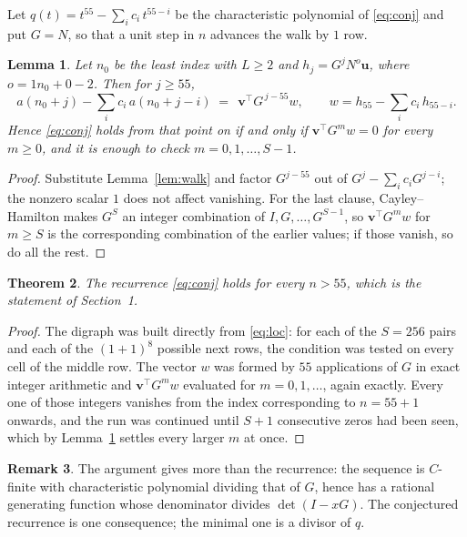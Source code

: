 \documentclass[11pt,a4paper]{article}
\theoremstyle{plain}
\newtheorem{theorem}{Theorem}
\newtheorem{lemma}[theorem]{Lemma}
\theoremstyle{definition}
\newtheorem{remark}[theorem]{Remark}
\begin{document}
Let $q(t)=t^{55}-\sum_i c_i\,t^{55-i}$ be the characteristic polynomial of
\eqref{eq:conj} and put $G=N$, so that a unit step in $n$ advances the walk by
$1$ row.

\begin{lemma}\label{lem:crit}
Let $n_0$ be the least index with $L\ge2$ and $h_j=G^{j}N^{o}\mathbf{u}$, where
$o=1n_0+0-2$. Then for $j\ge55$,
\[
a(n_0+j)-\sum_i c_i\,a(n_0+j-i)\;=\;\,\mathbf{v}^{\!\top}G^{\,j-55}w,
\qquad w=h_{55}-\sum_i c_i\,h_{55-i} .
\]
Hence \eqref{eq:conj} holds from that point on if and only if
$\mathbf{v}^{\!\top}G^{m}w=0$ for every $m\ge0$, and it is enough to check
$m=0,1,\dots,S-1$.
\end{lemma}

\begin{proof}
Substitute Lemma~\ref{lem:walk} and factor $G^{j-55}$ out of
$G^{j}-\sum_ic_iG^{j-i}$; the nonzero scalar $1$ does not affect
vanishing. For the last clause, Cayley--Hamilton makes $G^{S}$ an integer combination of
$I,G,\dots,G^{S-1}$, so $\mathbf{v}^{\!\top}G^{m}w$ for $m\ge S$ is the corresponding
combination of the earlier values; if those vanish, so do all the rest.
\end{proof}

\begin{theorem}
The recurrence \eqref{eq:conj} holds for every $n>55$, which is the statement of
Section~1.
\end{theorem}

\begin{proof}
The digraph was built directly from \eqref{eq:loc}: for each of the $S=256$ pairs and each
of the $(1+1)^{8}$ possible next rows, the condition was tested on every cell of
the middle row. The vector $w$ was formed by $55$ applications of $G$ in exact integer
arithmetic and $\mathbf{v}^{\!\top}G^{m}w$ evaluated for $m=0,1,\dots$, again exactly.
Every one of those integers vanishes from the index corresponding to $n=55+1$ onwards,
and the run was continued until $S+1$ consecutive zeros had been seen, which by
Lemma~\ref{lem:crit} settles every larger $m$ at once.
\end{proof}

\begin{remark}
The argument gives more than the recurrence: the sequence is $C$-finite with characteristic
polynomial dividing that of $G$, hence has a rational generating function whose denominator
divides $\det(I-xG)$. The conjectured recurrence is one consequence; the minimal one is a
divisor of $q$.
\end{remark}
\end{document}
